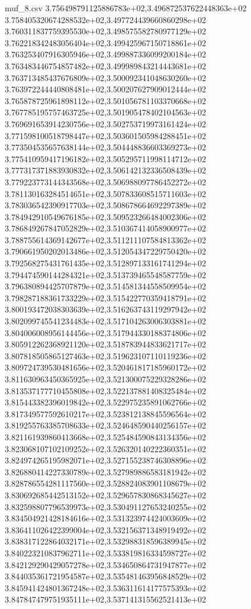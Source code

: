 \begin{filecontents*}{muf_8.csv}
3.756498791125886783e+02,3.496872537622448363e+02
3.758405320674288532e+02,3.497724439660860298e+02
3.760311837759395530e+02,3.498575582780977129e+02
3.762218342483056404e+02,3.499425967150718861e+02
3.763253407916305946e+02,3.499887336099200184e+02
3.763483446754857482e+02,3.499989843214443681e+02
3.763713485437676809e+02,3.500092341048630260e+02
3.763972244440808481e+02,3.500207627909012444e+02
3.765878725961898112e+02,3.501056781103370668e+02
3.767785195757463725e+02,3.501905478402104563e+02
3.769691653914230756e+02,3.502753719973161424e+02
3.771598100518798447e+02,3.503601505984288451e+02
3.773504535657638144e+02,3.504448836603369273e+02
3.775410959417196182e+02,3.505295711998114712e+02
3.777317371883930832e+02,3.506142132336508439e+02
3.779223773144343568e+02,3.506988097786452272e+02
3.781130163284514651e+02,3.507833608515711603e+02
3.783036542390917703e+02,3.508678664692297389e+02
3.784942910549676185e+02,3.509523266484002306e+02
3.786849267847052829e+02,3.510367414058900977e+02
3.788755614369142677e+02,3.511211107584813362e+02
3.790661950202013486e+02,3.512054347229750420e+02
3.792568275431761435e+02,3.512897133161741294e+02
3.794474590144284321e+02,3.513739465548587759e+02
3.796380894425707879e+02,3.514581344558509954e+02
3.798287188361733229e+02,3.515422770359418791e+02
3.800193472038303639e+02,3.516263743119297942e+02
3.802099745541234483e+02,3.517104263006303881e+02
3.804006008956144456e+02,3.517944330188374806e+02
3.805912262368921120e+02,3.518783944833621717e+02
3.807818505865127463e+02,3.519623107110119236e+02
3.809724739530481656e+02,3.520461817185960172e+02
3.811630963450365925e+02,3.521300075229328286e+02
3.813537177710455808e+02,3.522137881408325484e+02
3.815443382396019842e+02,3.522975235891062766e+02
3.817349577592610217e+02,3.523812138845596564e+02
3.819255763385708633e+02,3.524648590440256157e+02
3.821161939860413668e+02,3.525484590843134356e+02
3.823068107102109252e+02,3.526320140222360351e+02
3.824974265195982071e+02,3.527155238746308896e+02
3.826880414227330789e+02,3.527989886583181942e+02
3.828786554281117560e+02,3.528824083901108679e+02
3.830692685442513152e+02,3.529657830868345627e+02
3.832598807796539973e+02,3.530491127653240255e+02
3.834504921428184616e+02,3.531323974424003609e+02
3.836411026422399004e+02,3.532156371348919492e+02
3.838317122864032171e+02,3.532988318596389945e+02
3.840223210837962711e+02,3.533819816334598727e+02
3.842129290429057278e+02,3.534650864731947877e+02
3.844035361721954587e+02,3.535481463956848529e+02
3.845941424801367248e+02,3.536311614177575393e+02
3.847847479751935111e+02,3.537141315562521413e+02

\end{filecontents*}
